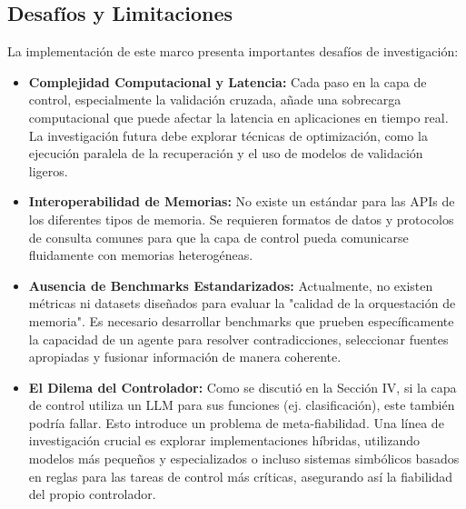 \documentclass[conference]{IEEEtran}
\begin{document}
\subsection{Desafíos y Limitaciones}
La implementación de este marco presenta importantes desafíos de investigación:
\begin{itemize}
    \item \textbf{Complejidad Computacional y Latencia:} Cada paso en la capa de control, especialmente la validación cruzada, añade una sobrecarga computacional que puede afectar la latencia en aplicaciones en tiempo real. La investigación futura debe explorar técnicas de optimización, como la ejecución paralela de la recuperación y el uso de modelos de validación ligeros.
    \item \textbf{Interoperabilidad de Memorias:} No existe un estándar para las APIs de los diferentes tipos de memoria. Se requieren formatos de datos y protocolos de consulta comunes para que la capa de control pueda comunicarse fluidamente con memorias heterogéneas.
    \item \textbf{Ausencia de Benchmarks Estandarizados:} Actualmente, no existen métricas ni datasets diseñados para evaluar la "calidad de la orquestación de memoria". Es necesario desarrollar benchmarks que prueben específicamente la capacidad de un agente para resolver contradicciones, seleccionar fuentes apropiadas y fusionar información de manera coherente.
    \item \textbf{El Dilema del Controlador:} Como se discutió en la Sección IV, si la capa de control utiliza un LLM para sus funciones (ej. clasificación), este también podría fallar. Esto introduce un problema de meta-fiabilidad. Una línea de investigación crucial es explorar implementaciones híbridas, utilizando modelos más pequeños y especializados o incluso sistemas simbólicos basados en reglas para las tareas de control más críticas, asegurando así la fiabilidad del propio controlador.
\end{itemize}
\end{document}
